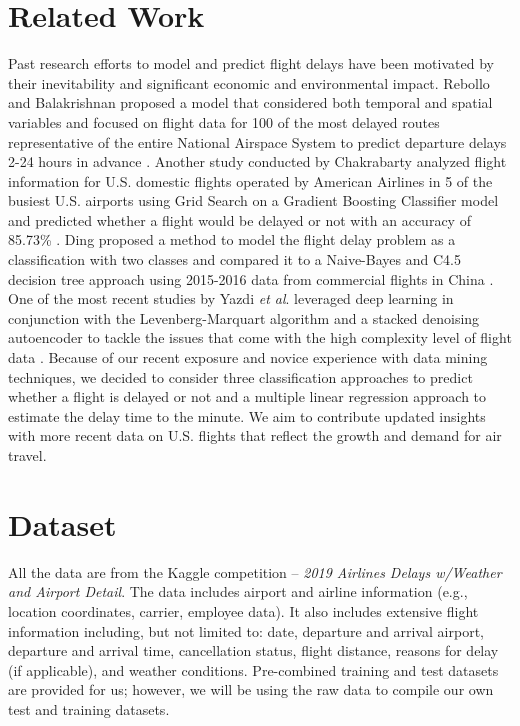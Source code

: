 \documentclass{article}
\begin{document}
\section{Related Work}
\label{relatedwork}
Past research efforts to model and predict flight delays have been motivated by their inevitability and significant economic and environmental impact. Rebollo and Balakrishnan proposed a model that considered both temporal and spatial variables and focused on flight data for 100 of the most delayed routes representative of the entire National Airspace System to predict departure delays 2-24 hours in advance \cite{8_rebollo_2014}. Another study conducted by Chakrabarty analyzed flight information for U.S. domestic flights operated by American Airlines in 5 of the busiest U.S. airports using Grid Search on a Gradient Boosting Classifier model and predicted whether a flight would be delayed or not with an accuracy of 85.73\% \cite{9_chakrabarty_2019}. Ding proposed a method to model the flight delay problem as a classification with two classes and compared it to a Naive-Bayes and C4.5 decision tree approach using 2015-2016 data from commercial flights in China \cite{10_ding_2017}. One of the most recent studies by Yazdi \emph{et al}. leveraged deep learning in conjunction with the Levenberg-Marquart algorithm and a stacked denoising autoencoder to tackle the issues that come with the high complexity level of flight data \cite{11_yazdi_2020}. Because of our recent exposure and novice experience with data mining techniques, we decided to consider three classification approaches to predict whether a flight is delayed or not and a multiple linear regression approach to estimate the delay time to the minute. We aim to contribute updated insights with more recent data on U.S. flights that reflect the growth and demand for air travel.


\section{Dataset}
\label{dataset}
All the data are from the Kaggle competition -- \textit{2019 Airlines Delays w/Weather and Airport Detail}. The data includes airport and airline information (e.g., location coordinates, carrier, employee data). It also includes extensive flight information including, but not limited to: date, departure and arrival airport, departure and arrival time, cancellation status, flight distance, reasons for delay (if applicable), and weather conditions. Pre-combined training and test datasets are provided for us; however, we will be using the raw data to compile our own test and training datasets.
\end{document}
